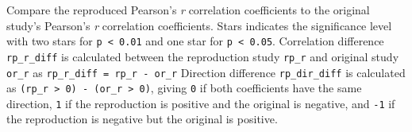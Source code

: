 \documentclass[
]{article}
\begin{document}
Compare the reproduced Pearson's \emph{r} correlation coefficients to
the original study's Pearson's \emph{r} correlation coefficients. Stars
indicates the significance level with two stars for
\texttt{p\ \textless{}\ 0.01} and one star for
\texttt{p\ \textless{}\ 0.05}. Correlation difference
\texttt{rp\_r\_diff} is calculated between the reproduction study
\texttt{rp\_r} and original study \texttt{or\_r} as
\texttt{rp\_r\_diff\ =\ rp\_r\ -\ or\_r} Direction difference
\texttt{rp\_dir\_diff} is calculated as
\texttt{(rp\_r\ \textgreater{}\ 0)\ -\ (or\_r\ \textgreater{}\ 0)},
giving \texttt{0} if both coefficients have the same direction,
\texttt{1} if the reproduction is positive and the original is negative,
and \texttt{-1} if the reproduction is negative but the original is
positive.

\begin{table}


\end{table}
\end{document}
